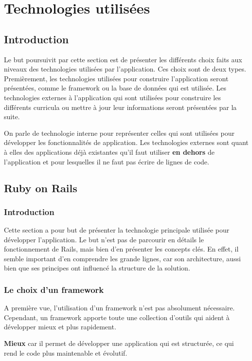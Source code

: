 \section{Technologies utilisées}
\subsection{Introduction}
Le but poursuivit par cette section est de présenter les différents choix faits aux niveaux des technologies utilisées par l'application. Ces choix sont de deux types. Premièrement, les technologies utilisées pour construire l'application seront présentées, comme le framework ou la base de données qui est utilisée. Les technologies externes à l'application qui sont utilisées pour construire les différents curricula ou mettre à jour leur informations seront présentées par la suite.

On parle de technologie interne pour représenter celles qui sont utilisées pour développer les fonctionnalités de application. Les technologies externes sont quant à elles des applications déjà existantes qu'il faut utiliser \textbf{en dehors} de l'application et pour lesquelles il ne faut pas écrire de lignes de code.
\subsection{Ruby on Rails}
\subsubsection{Introduction}

Cette section a pour but de présenter la technologie principale utilisée pour développer l'application. Le but n'est pas de parcourir en détails le fonctionnement de Rails, mais bien d'en présenter les concepts clés. En effet, il semble important d'en comprendre les grande lignes, car son architecture, aussi bien que ses principes ont influencé la structure de la solution.
\subsubsection{Le choix d'un framework}
A première vue, l'utilisation d'un framework n'est pas absolument nécessaire. Cependant, un framework apporte toute une collection d'outils qui aident à développer mieux et plus rapidement.

\textbf{Mieux} car il permet de développer une application qui est structurée, ce qui rend le code plus maintenable et évolutif.

